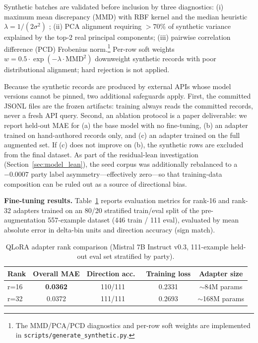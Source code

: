 \documentclass[12pt, letterpaper]{article}
\theoremstyle{definition}
\begin{document}
Synthetic batches are validated before inclusion by three diagnostics:
(i) maximum mean discrepancy (MMD) with RBF kernel and the median heuristic
$\lambda = 1/(2\sigma^2)$ \citep{Gretton2012}; (ii) PCA alignment requiring
$>70\%$ of synthetic variance explained by the top-2 real principal components;
(iii) pairwise correlation difference (PCD) Frobenius
norm.\footnote{The MMD/PCA/PCD diagnostics and per-row soft weights are
implemented in \texttt{scripts/generate\_synthetic.py}.} Per-row soft weights
$w = 0.5 \cdot \exp(-\lambda \cdot \mathrm{MMD}^2)$ downweight synthetic records
with poor distributional alignment; hard rejection is not applied.

Because the synthetic records are produced by external APIs whose model
versions cannot be pinned, two additional safeguards apply. First, the
committed JSONL files are the frozen artifacts: training always reads the
committed records, never a fresh API query. Second, an ablation protocol is a
paper deliverable: we report held-out MAE for (a) the base model with no
fine-tuning, (b) an adapter trained on hand-authored records only, and (c) an
adapter trained on the full augmented set. If (c) does not improve on (b), the
synthetic rows are excluded from the final dataset. As part of the residual-lean
investigation (Section~\ref{sec:model_lean}), the seed corpus was additionally
rebalanced to a $-0.0007$ party label asymmetry---effectively zero---so that
training-data composition can be ruled out as a source of directional bias.

\textbf{Fine-tuning results.} Table~\ref{tab:lora_ranks} reports evaluation
metrics for rank-16 and rank-32 adapters trained on an 80/20 stratified
train/eval split of the pre-augmentation 557-example dataset (446 train /
111 eval), evaluated by mean absolute error in delta-bin units and direction
accuracy (sign match).

\begin{table}[h]
\centering
\caption{QLoRA adapter rank comparison (Mistral 7B Instruct v0.3, 111-example
  held-out eval set stratified by party).}
\label{tab:lora_ranks}
\begin{tabular}{lcccc}
\toprule
Rank & Overall MAE & Direction acc.\ & Training loss & Adapter size \\
\midrule
r=16 & \textbf{0.0362} & 110/111 & 0.2331 & $\sim$84M params \\
r=32 & 0.0372          & 111/111 & 0.2693 & $\sim$168M params \\
\bottomrule
\end{tabular}
\end{table}
\end{document}
